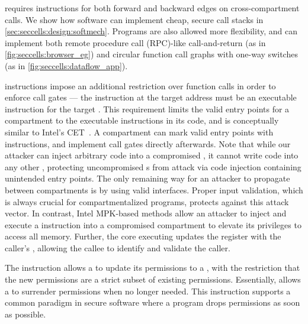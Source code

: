 \seccells requires \sdswitch instructions for both
forward and backward edges on cross-compartment calls.
We show how software can implement cheap, secure call
stacks in \autoref{sec:seccells:design:softmech}.
Programs are also allowed more flexibility, and can implement
both remote procedure call (RPC)-like call-and-return (as in
\autoref{fig:seccells:browser_eg})
and circular function call graphs with one-way switches 
(as in \autoref{fig:seccells:dataflow_app}).

\sdswitch instructions impose an additional
restriction over function calls in order to enforce call gates --- 
the instruction at the target address must be
an executable \sdentry instruction for the target \secdiv.
This requirement limits the valid entry points for a compartment
to the executable \sdentry instructions in its code, 
and is conceptually similar to Intel's CET~\cite{intelCET}.
A compartment can mark valid entry points with \sdentry 
instructions, and implement call gates directly afterwards.
Note that while our attacker can inject arbitrary code into a
compromised \secdiv, it cannot write code into
any other \secdiv, protecting uncompromised \secdiv{}s from 
attack via code injection containing unintended entry points.
The only remaining way for an attacker to propagate between 
compartments is by using valid interfaces.
Proper input validation, which is always crucial for 
compartmentalized programs, protects against this attack vector.
In contrast, Intel MPK-based methods allow an attacker to
inject and execute a  instruction into a compromised 
compartment to elevate its privileges to access all memory.
Further, the core executing \sdswitch updates the \rid
register with the caller's \sid,
allowing the callee to identify and validate the caller.

The \scprot instruction allows a \secdiv to update
its permissions to a \cell, with the restriction that the
new permissions are a strict subset of existing permissions.
Essentially, \scprot allows a \secdiv to surrender permissions
when no longer needed.
This instruction supports a common paradigm in secure software
where a program drops permissions as soon as possible.

